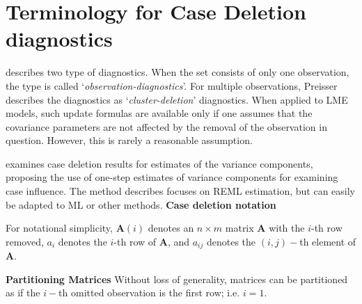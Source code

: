 \documentclass[12pt, a4paper]{report}
\theoremstyle{plain}
\theoremstyle{definition}
\theoremstyle{remark}
\begin{document}
%
%
	
\section{Terminology for Case Deletion diagnostics} %

\citet{preisser} describes two type of diagnostics. When the set consists of only one observation, the type is called
`\textit{observation-diagnostics}'. For multiple observations, Preisser describes the diagnostics as `\textit{cluster-deletion}' diagnostics. When applied to LME models, such update formulas are available only if one assumes that the covariance parameters are not affected by the removal of the observation in question. However, this is rarely a reasonable assumption.

	\citet{Christensen}examines case deletion results for estimates of
	the variance components, proposing the use of one-step estimates
	of variance components for examining case influence. The method
	describes focuses on REML estimation, but can easily be adapted to
	ML or other methods.
	\noindent \textbf{Case deletion notation} %
	
	For notational simplicity, $\boldsymbol{A}(i)$ denotes an $n \times m$ matrix $\boldsymbol{A}$ with the $i$-th row
	removed, $a_i$ denotes the $i$-th row of $\boldsymbol{A}$, and $a_{ij}$ denotes the $(i, j)-$th element of $\boldsymbol{A}$.
	
	\noindent \textbf{Partitioning Matrices} %
	Without loss of generality, matrices can be partitioned as if the $i-$th omitted observation is the first row; i.e. $i=1$.
	
\end{document}
